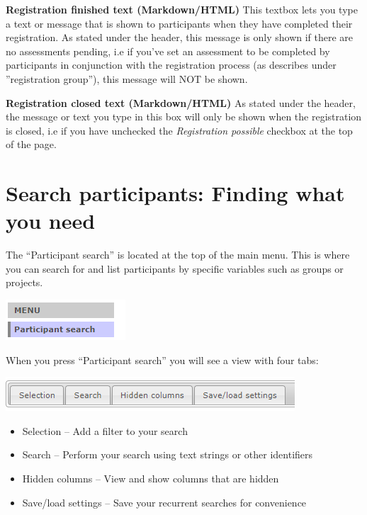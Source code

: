 \documentclass[
]{book}
\providecommand{\tightlist}{%
  \setlength{\itemsep}{0pt}\setlength{\parskip}{0pt}}
\begin{document}
\textbf{Registration finished text (Markdown/HTML)}
This textbox lets you type a text or message that is shown to participants when they have completed their registration. As stated under the header, this message is only shown if there are no assessments pending, i.e if you've set an assessment to be completed by participants in conjunction with the registration process (as describes under ''registration group''), this message will NOT be shown.

\textbf{Registration closed text (Markdown/HTML)}
As stated under the header, the message or text you type in this box will only be shown when the registration is closed, i.e if you have unchecked the \emph{Registration possible} checkbox at the top of the page.

\chapter{Search participants: Finding what you need}\label{search-participants-finding-what-you-need}

The ``Participant search'' is located at the top of the main menu. This is where you can search for and list participants by specific variables such as groups or projects.

\includegraphics{images/search-participants-menu.png}

When you press ``Participant search'' you will see a view with four tabs:

\includegraphics{images/search-participants-tab.png}

\begin{itemize}
\tightlist
\item
  Selection -- Add a filter to your search
\item
  Search -- Perform your search using text strings or other identifiers
\item
  Hidden columns -- View and show columns that are hidden
\item
  Save/load settings -- Save your recurrent searches for convenience
\end{itemize}
\end{document}
